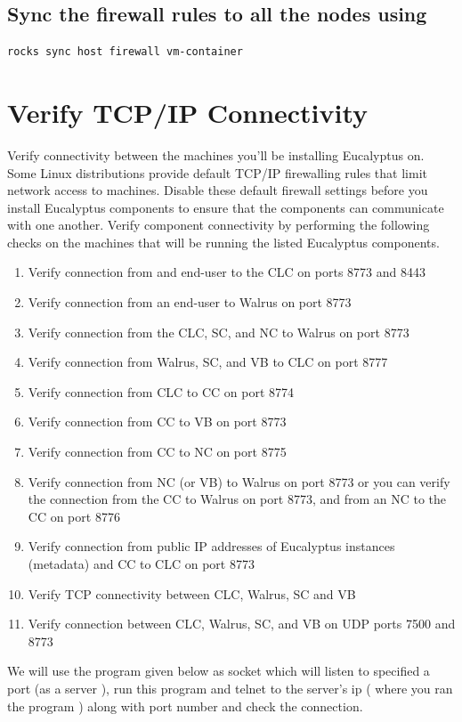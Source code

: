 \subsection{Sync the firewall rules to all the nodes using }
\begin{lstlisting}[language=bash]
rocks sync host firewall vm-container
\end{lstlisting}
\section{Verify TCP/IP Connectivity}

Verify connectivity between the machines you’ll be installing Eucalyptus on. Some Linux distributions provide default TCP/IP firewalling rules that limit network access to machines. Disable these default firewall settings before you install Eucalyptus components to ensure that the components can communicate with one another.
Verify component connectivity by performing the following checks on the machines that will be running the listed Eucalyptus components.
\begin{enumerate}
\item Verify connection from and end-user to the CLC on ports 8773 and 8443
\item Verify connection from an end-user to Walrus on port 8773
\item Verify connection from the CLC, SC, and NC to Walrus on port 8773
\item Verify connection from Walrus, SC, and VB to CLC on port 8777
\item Verify connection from CLC to CC on port 8774
\item Verify connection from CC to VB on port 8773
\item Verify connection from CC to NC on port 8775
\item Verify connection from NC (or VB) to Walrus on port 8773 or you can verify the connection from the CC to Walrus on port 8773, and from an NC to the CC on port 8776
\item Verify connection from public IP addresses of Eucalyptus instances (metadata) and CC to CLC on port 8773
\item Verify TCP connectivity between CLC, Walrus, SC and VB
\item Verify connection between CLC, Walrus, SC, and VB on UDP ports 7500 and 8773

\end{enumerate}
We will use the program given below as socket which will  listen to specified a port (as a server ), run this program and telnet to the server's ip ( where you ran the program ) along with port number and check the connection.

